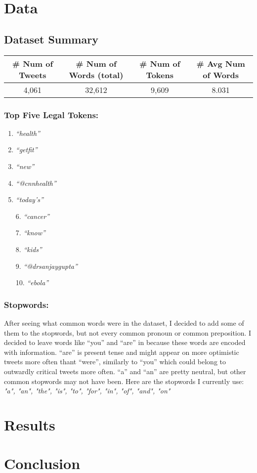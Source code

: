 \documentclass[fleqn]{article}
\begin{document}
\section{Data}
\subsection{Dataset Summary}
\begin{tabular}{|c|c|c|c|}
    \hline
    \textbf{\# Num of Tweets} & \textbf{\# Num of Words (total)} & \textbf{\# Num of Tokens} & \textbf{\# Avg Num of Words}\\
    \hline
    4,061&32,612&9,609&8.031\\
    \hline
\end{tabular}
\subsubsection*{Top Five Legal Tokens:}
\begin{minipage}{0.5\textwidth}
    \begin{enumerate}
        \item \textit{``health''}
        \item \textit{``getfit''}
        \item \textit{``new''}
        \item \textit{``@cnnhealth''}
        \item \textit{``today's''}
    \end{enumerate}
\end{minipage}
\begin{minipage}{0.5\textwidth}
    \begin{enumerate}
        \item[6.] \textit{``cancer''}
        \item[7.] \textit{``know''}
        \item[8.] \textit{``kids''}
        \item[9.] \textit{``@drsanjaygupta''}
        \item[10.] \textit{``ebola''}
    \end{enumerate}
\end{minipage}


\subsubsection{Stopwords:}
After seeing what common words were in the dataset, I decided to add some of them to the stopwords, but not every common pronoun or common preposition.  I decided to leave words like ``you'' and ``are'' in because these words are encoded with information.  ``are'' is present tense and might appear on more optimistic tweets more often thant ``were'', similarly to ``you'' which could belong to outwardly critical tweets more often.  ``a'' and ``an'' are pretty neutral, but other common stopwords may not have been.  Here are the stopwords I currently use:\\
\newline
\textit{"a", "an", "the", "is", "to", "for", "in", "of", "and", "on"}

\section{Results}
\section{Conclusion}
\end{document}

